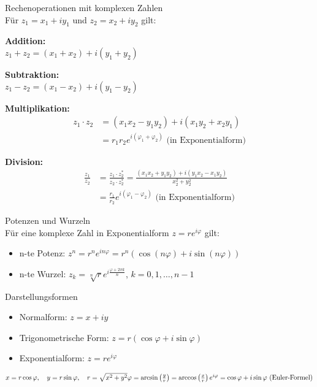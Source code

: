 \begin{theorem}{Rechenoperationen mit komplexen Zahlen}\\
Für $z_1 = x_1 + iy_1$ und $z_2 = x_2 + iy_2$ gilt:
\vspace{1mm}\\
\begin{minipage}[t]{0.45\textwidth}
    \textbf{Addition:}\\
    $z_1 + z_2 = (x_1 + x_2) + i(y_1 + y_2)$
\end{minipage}
\hspace{3mm}
\begin{minipage}[t]{0.45\textwidth}
    \textbf{Subtraktion:}\\
    $z_1 - z_2 = (x_1 - x_2) + i(y_1 - y_2)$
\end{minipage}

\vspace{2mm}
\textbf{Multiplikation:}
\begin{align*}
    z_1 \cdot z_2 &= (x_1x_2 - y_1y_2) + i(x_1y_2 + x_2y_1)\\
    &= r_1r_2e^{i(\varphi_1 + \varphi_2)} \text{ (in Exponentialform)}
\end{align*}

\textbf{Division:}
\begin{align*}
    \frac{z_1}{z_2} &= \frac{z_1 \cdot z_2^*}{z_2 \cdot z_2^*} = \frac{(x_1x_2 + y_1y_2) + i(y_1x_2 - x_1y_2)}{x_2^2 + y_2^2}\\
    &= \frac{r_1}{r_2}e^{i(\varphi_1 - \varphi_2)} \text{ (in Exponentialform)}
\end{align*}
\end{theorem}

\begin{theorem}{Potenzen und Wurzeln}\\
Für eine komplexe Zahl in Exponentialform $z = re^{i\varphi}$ gilt:
\begin{itemize}
    \item n-te Potenz: $z^n = r^ne^{in\varphi} = r^n(\cos(n\varphi) + i\sin(n\varphi))$
    \item n-te Wurzel: $z_k = \sqrt[n]{r}e^{i\frac{\varphi + 2\pi k}{n}}$, $k = 0,1,\ldots,n-1$
\end{itemize}
\end{theorem}

\begin{concept}{Darstellungsformen}
\begin{itemize}
    \item Normalform: $z = x + iy$
    \item Trigonometrische Form: $z = r(\cos\varphi + i\sin\varphi)$
    \item Exponentialform: $z = re^{i\varphi}$
\end{itemize}
$x = r\cos\varphi, \quad y = r\sin\varphi, \quad r = \sqrt{x^2 + y^2}\\
    \varphi = \arcsin\left(\frac{y}{r}\right) = \arccos\left(\frac{x}{r}\right)\\
    e^{i\varphi} = \cos\varphi + i\sin\varphi \text{ (Euler-Formel)}$

\end{concept}


